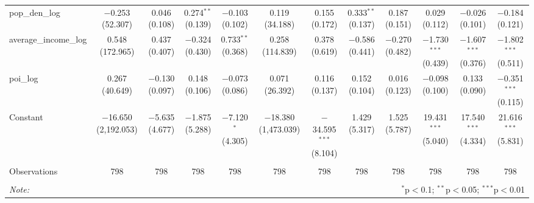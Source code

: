 \begin{table}[!htbp]
\begin{tabular}{@{\extracolsep{1pt}}lccccccccccc}
  pop\_den\_log & $-$0.253 (52.307) & 0.046 (0.108) & 0.274$^{**}$ (0.139) & $-$0.103 (0.102) & 0.119 (34.188) & 0.155 (0.172) & 0.333$^{**}$ (0.137) & 0.187 (0.151) & 0.029 (0.112) & $-$0.026 (0.101) & $-$0.184 (0.121) \\ 
  average\_income\_log & 0.548 (172.965) & 0.437 (0.407) & $-$0.324 (0.430) & 0.733$^{**}$ (0.368) & 0.258 (114.839) & 0.378 (0.619) & $-$0.586 (0.441) & $-$0.270 (0.482) & $-$1.730$^{***}$ (0.439) & $-$1.607$^{***}$ (0.376) & $-$1.802$^{***}$ (0.511) \\ 
  poi\_log & 0.267 (40.649) & $-$0.130 (0.097) & 0.148 (0.106) & $-$0.073 (0.086) & 0.071 (26.392) & 0.116 (0.137) & 0.152 (0.104) & 0.016 (0.123) & $-$0.098 (0.100) & 0.133 (0.090) & $-$0.351$^{***}$ (0.115) \\ 
  Constant & $-$16.650 (2,192.053) & $-$5.635 (4.677) & $-$1.875 (5.288) & $-$7.120$^{*}$ (4.305) & $-$18.380 (1,473.039) & $-$34.595$^{***}$ (8.104) & 1.429 (5.317) & 1.525 (5.787) & 19.431$^{***}$ (5.040) & 17.540$^{***}$ (4.334) & 21.616$^{***}$ (5.831) \\ 
 \hline \\[-1.8ex] 
Observations & 798 & 798 & 798 & 798 & 798 & 798 & 798 & 798 & 798 & 798 & 798 \\ 
\hline 
\hline \\[-1.8ex] 
\textit{Note:}  & \multicolumn{11}{r}{$^{*}$p$<$0.1; $^{**}$p$<$0.05; $^{***}$p$<$0.01} \\ 
\end{tabular} 
\end{table} 
